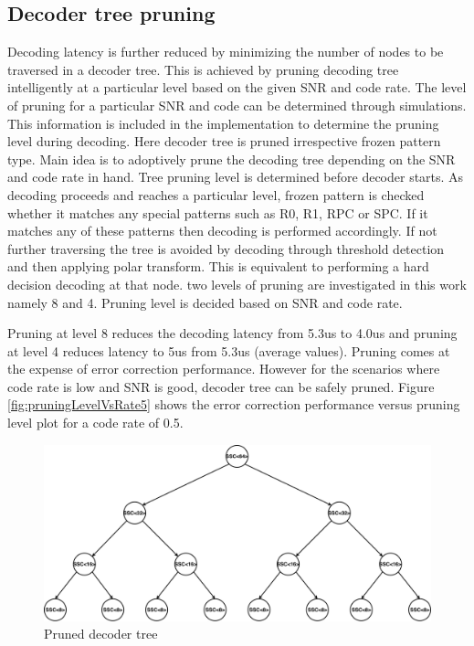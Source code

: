\subsection{Decoder tree pruning}
Decoding latency is further reduced by minimizing the number of nodes to be traversed in a decoder tree. This is achieved by pruning decoding tree intelligently at a particular level based on the given SNR and code rate. The level of pruning for a particular SNR and code can be determined through simulations. This information is included in the implementation to determine the pruning level during decoding. Here decoder tree is pruned irrespective frozen pattern type. Main idea is to adoptively prune the decoding tree depending on the SNR and code rate in hand. Tree pruning level is determined before decoder starts. As decoding proceeds and reaches a particular level, frozen pattern is checked whether it matches any special patterns such as R0, R1, RPC or SPC. If it matches any of these patterns then decoding is performed accordingly. If not further traversing the tree is avoided by decoding through threshold detection and then applying polar transform. This is equivalent to performing a hard decision decoding at that node. two levels of pruning are investigated in this work namely 8 and 4. Pruning level is decided based on SNR and code rate.

Pruning at level 8 reduces the decoding latency from 5.3us to 4.0us and pruning at level 4 reduces latency to 5us from 5.3us (average values). Pruning comes at the expense of error correction performance. However for the scenarios where code rate is low and SNR is good, decoder tree can be safely pruned. Figure \ref{fig:pruningLevelVsRate5} shows the error correction performance versus pruning level plot for a code rate of 0.5.


\begin{figure}[]
	\centering
	\includegraphics[width=1\textwidth]{./figures/prunedDecoderTree.pdf}
	\caption{Pruned decoder tree}
	\label{fig:prunedDecoderTree}
\end{figure}


